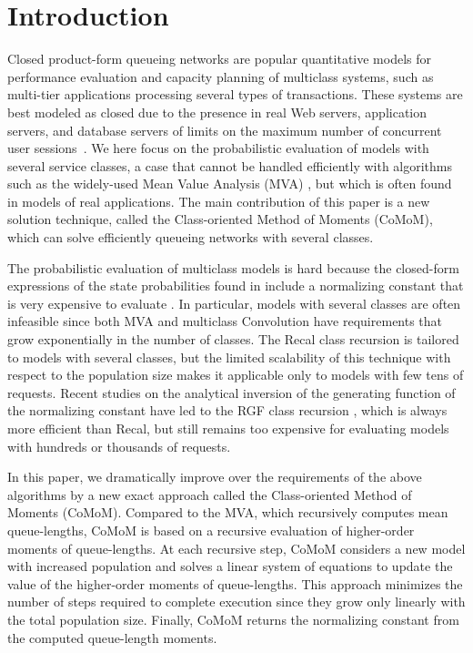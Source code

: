 \documentclass[journal,twocolumn,9.5pt]{IEEEtran}
\begin{document}
\section{Introduction}
Closed product-form queueing networks are popular quantitative models for performance evaluation and capacity planning of multiclass systems, such as multi-tier applications processing several types of transactions\cite{BasCMP75,ChuAT97,MenA98,KouB03,UrgPSST05}. These systems are best modeled as closed due to the presence in real Web servers, application servers, and database servers of limits on the maximum number of concurrent user sessions~\cite{UrgPSST05}. We here focus on the probabilistic evaluation of models with several service classes, a case that cannot be handled efficiently with algorithms such as the widely-used Mean Value Analysis (MVA) \cite{ReiL80}, but which is often found in models of real applications. The main contribution of this paper is a new solution technique, called the Class-oriented Method of Moments (CoMoM), which can solve efficiently queueing networks with several classes.

The probabilistic evaluation of multiclass models is hard because the closed-form expressions of the state probabilities found in \cite{BasCMP75} include a {normalizing constant} that is very expensive to evaluate \cite{ReiK75b,ChaS80,ConG86,HarC02,Cas06b}. In particular, models with several classes are often infeasible since both MVA and multiclass Convolution \cite{ReiK75b} have requirements that grow exponentially in the number of classes. The {\sc Recal} class recursion \cite{ConG86} is tailored to models with several classes, but the limited scalability of this technique with respect to the population size makes it applicable only to models with few tens of requests. Recent studies on the analytical inversion of the generating function of the normalizing constant have led to the RGF class recursion \cite{HarC02,HarL04}, which is always more efficient than {\sc Recal}, but still remains too expensive for evaluating models with hundreds or thousands of requests. %


In this paper, we dramatically improve over the requirements of the above algorithms by a new exact approach called the Class-oriented Method of Moments (CoMoM). Compared to the MVA, which recursively computes mean queue-lengths, CoMoM is based on a recursive evaluation of higher-order moments of queue-lengths. At each recursive step, CoMoM considers a new model with increased population and solves a linear system of equations to update the value of the higher-order moments of queue-lengths. This approach minimizes the number of steps required to complete execution since they grow only linearly with the total population size. Finally, CoMoM returns the normalizing constant from the computed queue-length moments.
\end{document}
